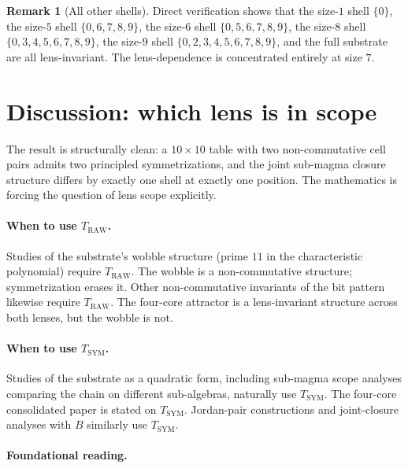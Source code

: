 \documentclass[11pt,reqno]{amsart}
\theoremstyle{definition}
\newtheorem{remark}[theorem]{Remark}
\newcommand{\TRAW}{T_{\mathrm{RAW}}}
\newcommand{\TSYM}{T_{\mathrm{SYM}}}
\newcommand{\BHML}{B}
\begin{document}
\begin{remark}[All other shells]
\label{rem:other-shells}
Direct verification shows that the size-$1$ shell $\{0\}$, the
size-$5$ shell $\{0, 6, 7, 8, 9\}$, the size-$6$ shell
$\{0, 5, 6, 7, 8, 9\}$, the size-$8$ shell
$\{0, 3, 4, 5, 6, 7, 8, 9\}$, the size-$9$ shell
$\{0, 2, 3, 4, 5, 6, 7, 8, 9\}$, and the full substrate are all
lens-invariant. The lens-dependence is concentrated entirely at
size $7$.
\end{remark}

\section{Discussion: which lens is in scope}
\label{sec:discussion}

The result is structurally clean: a $10 \times 10$ table with two
non-commutative cell pairs admits two principled symmetrizations,
and the joint sub-magma closure structure differs by exactly one
shell at exactly one position. The mathematics is forcing the
question of lens scope explicitly.

\paragraph{When to use $\TRAW$.}

Studies of the substrate's wobble structure (prime $11$ in the
characteristic polynomial) require $\TRAW$. The wobble is a
non-commutative structure; symmetrization erases it. Other
non-commutative invariants of the bit pattern likewise require
$\TRAW$. The four-core attractor is a lens-invariant structure
across both lenses, but the wobble is not.

\paragraph{When to use $\TSYM$.}

Studies of the substrate as a quadratic form, including
sub-magma scope analyses comparing the chain on different
sub-algebras, naturally use $\TSYM$. The four-core consolidated
paper \cite{Sanders2026FourCore} is stated on $\TSYM$. Jordan-pair
constructions and joint-closure analyses with $\BHML$ similarly
use $\TSYM$.

\paragraph{Foundational reading.}
\end{document}
